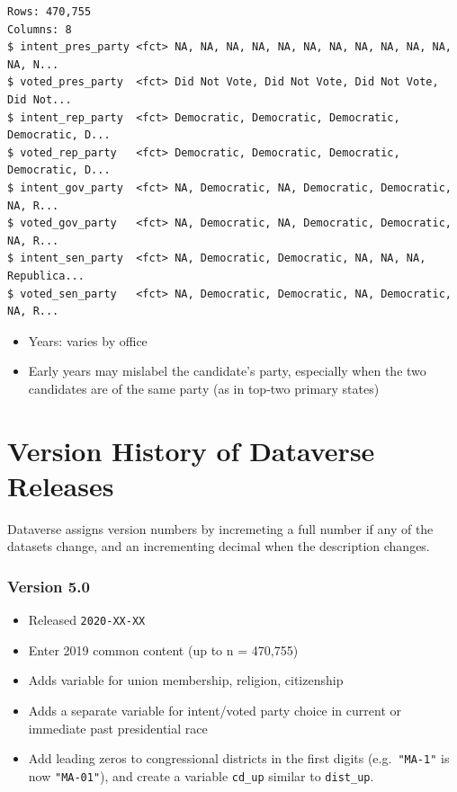 \documentclass[10pt,article,oneside]{memoir}
\theoremstyle{definition}
\begin{document}
\begin{verbatim}
Rows: 470,755
Columns: 8
$ intent_pres_party <fct> NA, NA, NA, NA, NA, NA, NA, NA, NA, NA, NA, NA, N...
$ voted_pres_party  <fct> Did Not Vote, Did Not Vote, Did Not Vote, Did Not...
$ intent_rep_party  <fct> Democratic, Democratic, Democratic, Democratic, D...
$ voted_rep_party   <fct> Democratic, Democratic, Democratic, Democratic, D...
$ intent_gov_party  <fct> NA, Democratic, NA, Democratic, Democratic, NA, R...
$ voted_gov_party   <fct> NA, Democratic, NA, Democratic, Democratic, NA, R...
$ intent_sen_party  <fct> NA, Democratic, Democratic, NA, NA, NA, Republica...
$ voted_sen_party   <fct> NA, Democratic, Democratic, NA, Democratic, NA, R...
\end{verbatim}

\begin{itemize}
\tightlist
\item
  Years: varies by office
\item
  Early years may mislabel the candidate's party, especially when the
  two candidates are of the same party (as in top-two primary states)
\end{itemize}

\newpage

\hypertarget{version-history-of-dataverse-releases}{%
\section{Version History of Dataverse
Releases}\label{version-history-of-dataverse-releases}}

Dataverse assigns version numbers by incremeting a full number if any of
the datasets change, and an incrementing decimal when the description
changes.

\hypertarget{version-5.0}{%
\subsubsection{Version 5.0}\label{version-5.0}}

\begin{itemize}
\tightlist
\item
  Released \texttt{2020-XX-XX}
\item
  Enter 2019 common content (up to n = 470,755)
\item
  Adds variable for union membership, religion, citizenship
\item
  Adds a separate variable for intent/voted party choice in current or
  immediate past presidential race
\item
  Add leading zeros to congressional districts in the first digits
  (e.g.~\texttt{"MA-1"} is now \texttt{"MA-01"}), and create a variable
  \texttt{cd\_up} similar to \texttt{dist\_up}.
\end{itemize}
\end{document}

